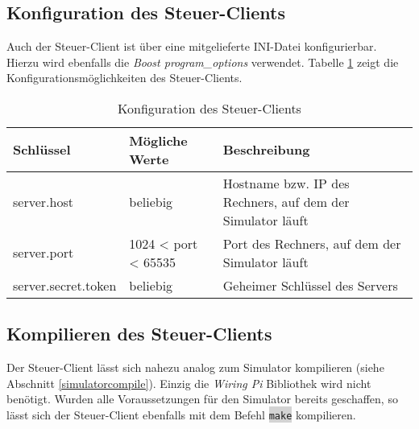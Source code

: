\subsection{Konfiguration des Steuer-Clients}
Auch der Steuer-Client ist über eine mitgelieferte INI-Datei konfigurierbar. Hierzu wird ebenfalls die \emph{Boost program\_options} verwendet.
Tabelle \ref{tab:clientconfig} zeigt die Konfigurationsmöglichkeiten des Steuer-Clients.

\begin{table}[h]
\centering
\begin{tabularx}{\textwidth}{|p{}|p{}|X|}
\hline
\textbf{Schlüssel} & \textbf{Mögliche Werte} & \textbf{Beschreibung} \\ \hline
server.host & beliebig & Hostname bzw. IP des Rechners, auf dem der Simulator läuft \\ \hline
server.port & 1024 < port < 65535 & Port des Rechners, auf dem der Simulator läuft \\ \hline
server.secret.token & beliebig & Geheimer Schlüssel des Servers \\ \hline
\end{tabularx}
\caption{Konfiguration des Steuer-Clients}
\label{tab:clientconfig}
\end{table}

\subsection{Kompilieren des Steuer-Clients}
Der Steuer-Client lässt sich nahezu analog zum Simulator kompilieren (siehe Abschnitt \ref{simulatorcompile}). Einzig die \emph{Wiring Pi} Bibliothek wird nicht benötigt. Wurden alle Voraussetzungen für den Simulator bereits geschaffen, so lässt sich der Steuer-Client ebenfalls mit dem Befehl \colorbox{lightgrey}{\lstinline[basicstyle=\ttfamily]|make|} kompilieren.